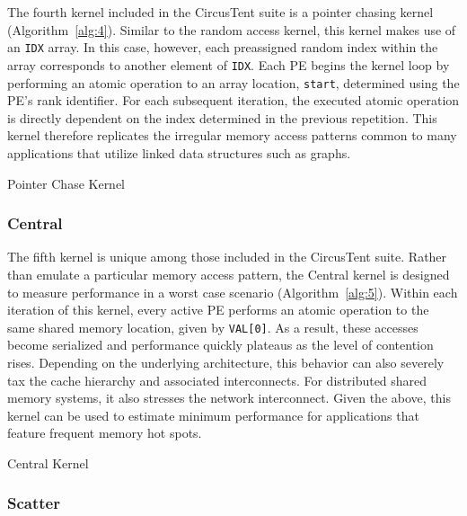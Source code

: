 The fourth kernel included in the CircusTent suite is a pointer chasing kernel (Algorithm~\ref{alg:4}).
Similar to the random access kernel, this kernel makes use of an \texttt{IDX} array.
In this case, however, each preassigned random index within the array corresponds to another element of \texttt{IDX}.
Each PE begins the kernel loop by performing an atomic operation to an array location, \texttt{start}, determined using the PE's rank identifier.
For each subsequent iteration, the executed atomic operation is directly dependent on the index determined in the previous repetition.
This kernel therefore replicates the irregular memory access patterns common to many applications that utilize linked data structures such as graphs.

\begin{algorithm}
\SetAlgoLined
{}
\caption{Pointer Chase Kernel}
\label{alg:4}
\end{algorithm}

\subsubsection{Central}
\label{subsubsec:central}

The fifth kernel is unique among those included in the CircusTent suite.
Rather than emulate a particular memory access pattern, the Central kernel is designed to measure performance in a worst case scenario (Algorithm~\ref{alg:5}).
Within each iteration of this kernel, every active PE performs an atomic operation to the same shared memory location, given by \texttt{VAL[0]}.
As a result, these accesses become serialized and performance quickly plateaus as the level of contention rises.
Depending on the underlying architecture, this behavior can also severely tax the cache hierarchy and associated interconnects.
For distributed shared memory systems, it also stresses the network interconnect.
Given the above, this kernel can be used to estimate minimum performance for applications that feature frequent memory hot spots.

\begin{algorithm}
\SetAlgoLined
{}
\caption{Central Kernel}
\label{alg:5}
\end{algorithm}

\subsubsection{Scatter}
\label{subsubsec:scatter}

